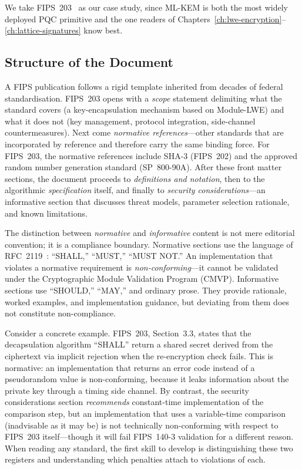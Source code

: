 We take FIPS~203~\cite{FIPS203} as our case study, since ML-KEM is both the most widely deployed PQC primitive and the one readers of Chapters~\ref{ch:lwe-encryption}--\ref{ch:lattice-signatures} know best.

\subsection{Structure of the Document}
\label{subsec:fips-structure}

A FIPS publication follows a rigid template inherited from decades of federal standardisation. FIPS~203 opens with a \emph{scope} statement delimiting what the standard covers (a key-encapsulation mechanism based on Module-LWE) and what it does not (key management, protocol integration, side-channel countermeasures). Next come \emph{normative references}---other standards that are incorporated by reference and therefore carry the same binding force. For FIPS~203, the normative references include SHA-3 (FIPS~202) and the approved random number generation standard (SP~800-90A). After these front matter sections, the document proceeds to \emph{definitions and notation}, then to the algorithmic \emph{specification} itself, and finally to \emph{security considerations}---an informative section that discusses threat models, parameter selection rationale, and known limitations.

The distinction between \emph{normative} and \emph{informative} content is not mere editorial convention; it is a compliance boundary. Normative sections use the language of RFC~2119~\cite{RFC8446}: ``SHALL,'' ``MUST,'' ``MUST NOT.'' An implementation that violates a normative requirement is \emph{non-conforming}---it cannot be validated under the Cryptographic Module Validation Program (CMVP). Informative sections use ``SHOULD,'' ``MAY,'' and ordinary prose. They provide rationale, worked examples, and implementation guidance, but deviating from them does not constitute non-compliance.

Consider a concrete example. FIPS~203, Section~3.3, states that the decapsulation algorithm ``SHALL'' return a shared secret derived from the ciphertext via implicit rejection when the re-encryption check fails. This is normative: an implementation that returns an error code instead of a pseudorandom value is non-conforming, because it leaks information about the private key through a timing side channel. By contrast, the security considerations section \emph{recommends} constant-time implementation of the comparison step, but an implementation that uses a variable-time comparison (inadvisable as it may be) is not technically non-conforming with respect to FIPS~203 itself---though it will fail FIPS~140-3 validation for a different reason. When reading any standard, the first skill to develop is distinguishing these two registers and understanding which penalties attach to violations of each.

